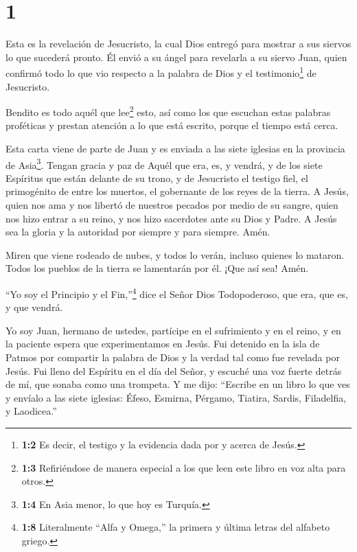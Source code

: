 \hypertarget{section}{%
\section{1}\label{section}}

 Esta es la revelación de Jesucristo, la cual Dios entregó
para mostrar a sus siervos lo que sucederá pronto. Él envió a su ángel
para revelarla a su siervo Juan,  quien confirmó todo lo que
vio respecto a la palabra de Dios y el testimonio\footnote{\textbf{1:2}
  Es decir, el testigo y la evidencia dada por y acerca de Jesús.} de
Jesucristo.

 Bendito es todo aquél que lee\footnote{\textbf{1:3}
  Refiriéndose de manera especial a los que leen este libro en voz alta
  para otros.} esto, así como los que escuchan estas palabras proféticas
y prestan atención a lo que está escrito, porque el tiempo está cerca.

 Esta carta viene de parte de Juan y es enviada a las siete
iglesias en la provincia de Asia\footnote{\textbf{1:4} En Asia menor, lo
  que hoy es Turquía.}. Tengan gracia y paz de Aquél que era, es, y
vendrá, y de los siete Espíritus que están delante de su trono,
 y de Jesucristo el testigo fiel, el primogénito de entre
los muertos, el gobernante de los reyes de la tierra. A Jesús, quien nos
ama y nos libertó de nuestros pecados por medio de su sangre,
 quien nos hizo entrar a su reino, y nos hizo sacerdotes
ante su Dios y Padre. A Jesús sea la gloria y la autoridad por siempre y
para siempre. Amén.

 Miren que viene rodeado de nubes, y todos lo verán, incluso
quienes lo mataron. Todos los pueblos de la tierra se lamentarán por él.
¡Que así sea! Amén.

 ``Yo soy el Principio y el Fin,''\footnote{\textbf{1:8}
  Literalmente ``Alfa y Omega,'' la primera y última letras del alfabeto
  griego.} dice el Señor Dios Todopoderoso, que era, que es, y que
vendrá.

 Yo soy Juan, hermano de ustedes, partícipe en el
sufrimiento y en el reino, y en la paciente espera que experimentamos en
Jesús. Fui detenido en la isla de Patmos por compartir la palabra de
Dios y la verdad tal como fue revelada por Jesús.  Fui
lleno del Espíritu en el día del Señor, y escuché una voz fuerte detrás
de mí, que sonaba como una trompeta.  Y me dijo: ``Escribe
en un libro lo que ves y envíalo a las siete iglesias: Éfeso, Esmirna,
Pérgamo, Tiatira, Sardis, Filadelfia, y Laodicea.''

